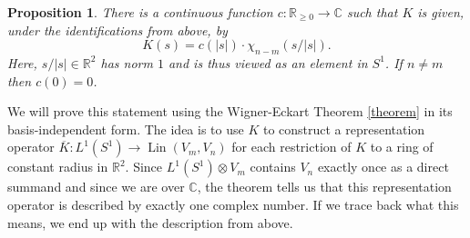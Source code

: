 \documentclass[12pt, a4paper]{article}
\theoremstyle{plain}
\newtheorem{pro}{Proposition}[section]
\theoremstyle{definition}
\theoremstyle{remark}
\newcommand{\R}{\mathds{R}}
\newcommand{\C}{\mathds{C}}
\DeclareMathOperator{\lin}{Lin}
\begin{document}
\begin{pro}\label{Wigner-Eckart}
There is a continuous function $c: \R_{\geq 0} \to \C$ such that $K$ is given, under the identifications from above, by
\begin{equation*}
K(s) = c\left(|s|\right) \cdot \chi_{n - m}\left(s/|s|\right).
\end{equation*}
Here, $s/|s| \in \R^2$ has norm $1$ and is thus viewed as an element in $S^1$. If $n \neq m$ then $c(0) = 0$.
\end{pro}

We will prove this statement using the Wigner-Eckart Theorem \ref{theorem} in its basis-independent form. The idea is to use $K$ to construct a representation operator $\overline{K}: L^1(S^1) \to \lin(V_m, V_n)$ for each restriction of $K$ to a ring of constant radius in $\R^2$. Since $L^1(S^1) \otimes V_m$ contains $V_n$ exactly once as a direct summand and since we are over $\C$, the theorem tells us that this representation operator is described by exactly one complex number. If we trace back what this means, we end up with the description from above.
\end{document}
